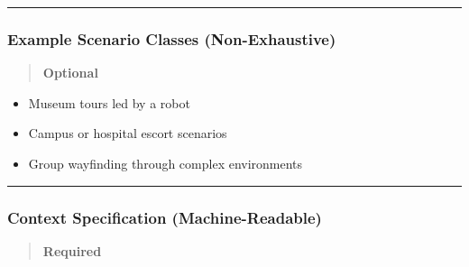 \documentclass[utf8]{frontiers_suppmat} %
\providecommand{\tightlist}{%
  \setlength{\itemsep}{0pt}\setlength{\parskip}{0pt}}
\begin{document}
\begin{center}\rule{0.5\linewidth}{0.5pt}\end{center}

\subsubsection{Example Scenario Classes
(Non-Exhaustive)}\label{example-scenario-classes-non-exhaustive}

\begin{quote}
\textbf{Optional}
\end{quote}

\begin{itemize}
\tightlist
\item
  Museum tours led by a robot
\item
  Campus or hospital escort scenarios
\item
  Group wayfinding through complex environments
\end{itemize}

\begin{center}\rule{0.5\linewidth}{0.5pt}\end{center}

\subsubsection{Context Specification
(Machine-Readable)}\label{context-specification-machine-readable}

\begin{quote}
\textbf{Required}
\end{quote}
\end{document}
